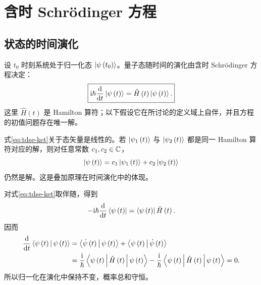 \section{含时 Schr\"odinger 方程}
\subsection{状态的时间演化}
设 $t_0$ 时刻系统处于归一化态 $\Ket{\psi\left(t_0\right)}$。量子态随时间的演化由含时 Schr\"odinger 方程决定：
\begin{equation}
\boxed{\mathrm{i}\hbar\frac{\mathrm{d}}{\mathrm{d}t}\Ket{\psi\left(t\right)}
=\hat H\left(t\right)\Ket{\psi\left(t\right)}.}
\label{eq:tdse-ket}
\end{equation}
这里 $\hat H\left(t\right)$ 是 Hamilton 算符；以下假设它在所讨论的定义域上自伴，并且方程的初值问题存在唯一解。

式\eqref{eq:tdse-ket}关于态矢量是线性的。若 $\Ket{\psi_1\left(t\right)}$ 与
$\Ket{\psi_2\left(t\right)}$ 都是同一 Hamilton 算符对应的解，则对任意常数
$c_1,c_2\in\mathbb{C}$，
\begin{equation}
\Ket{\psi\left(t\right)}=c_1\Ket{\psi_1\left(t\right)}
+c_2\Ket{\psi_2\left(t\right)}
\end{equation}
仍然是解。这是叠加原理在时间演化中的体现。

对式\eqref{eq:tdse-ket}取伴随，得到
\begin{equation}
-\mathrm{i}\hbar\frac{\mathrm{d}}{\mathrm{d}t}\Bra{\psi\left(t\right)}
=\Bra{\psi\left(t\right)}\hat H\left(t\right).
\end{equation}
因而
\begin{align}
\frac{\mathrm{d}}{\mathrm{d}t}\Braket{\psi\left(t\right)|\psi\left(t\right)}
&=\Braket{\dot\psi\left(t\right)|\psi\left(t\right)}
+\Braket{\psi\left(t\right)|\dot\psi\left(t\right)}\notag\\
&=\frac{\mathrm{i}}{\hbar}\Braket{\psi\left(t\right)|\hat H\left(t\right)|\psi\left(t\right)}
-\frac{\mathrm{i}}{\hbar}\Braket{\psi\left(t\right)|\hat H\left(t\right)|\psi\left(t\right)}=0.
\end{align}
所以归一化在演化中保持不变，概率总和守恒。

